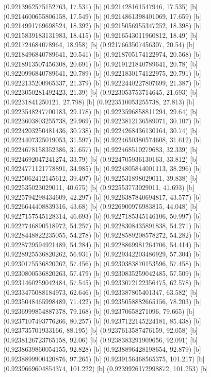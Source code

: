 {{{(0.9213962575152763, 17.531) [b] 
(0.921428161547946, 17.535) [b] 
(0.9214600655806158, 17.549) [b] 
(0.9214861398401069, 17.659) [b] 
(0.9214991769698524, 18.392) [b] 
(0.9215056955347252, 18.398) [b] 
(0.9215839183131983, 18.415) [b] 
(0.9216543011960812, 18.49) [b] 
(0.921724684078964, 18.958) [b] 
(0.9217663507456307, 20.54) [b] 
(0.9218496840789641, 20.541) [b] 
(0.9218705174122974, 20.568) [b] 
(0.9218913507456308, 20.691) [b] 
(0.9219121840789641, 20.78) [b] 
(0.9220996840789641, 20.789) [b] 
(0.9221830174122975, 20.791) [b] 
(0.9222135200965337, 21.379) [b] 
(0.9222440227807699, 21.387) [b] 
(0.9223050281492423, 21.39) [b] 
(0.9223053753714645, 21.693) [b] 
(0.92231841250121, 27.798) [b] 
(0.9223510053255738, 27.813) [b] 
(0.9223548247700183, 29.178) [b] 
(0.9223596858811294, 29.64) [b] 
(0.9223603803255738, 29.969) [b] 
(0.9223812136589071, 30.107) [b] 
(0.9224203250481436, 30.738) [b] 
(0.9224268436130164, 30.74) [b] 
(0.9224407325019053, 31.597) [b] 
(0.9224650380574608, 31.612) [b] 
(0.9224678158352386, 31.657) [b] 
(0.922468510279683, 32.339) [b] 
(0.9224692047241274, 33.79) [b] 
(0.9224705936130163, 33.812) [b] 
(0.9224771121778891, 34.985) [b] 
(0.9224805844001113, 38.296) [b] 
(0.9225062412145612, 39.497) [b] 
(0.922531898029011, 39.838) [b] 
(0.922535023029011, 40.675) [b] 
(0.922553773029011, 41.693) [b] 
(0.9225794298434609, 42.297) [b] 
(0.9226387840694817, 43.577) [b] 
(0.9226644408839316, 43.68) [b] 
(0.9226900976983815, 44.048) [b] 
(0.9227157545128314, 46.693) [b] 
(0.9227185345146106, 50.997) [b] 
(0.9227746890518972, 54.257) [b] 
(0.9228308435891838, 54.271) [b] 
(0.9228448822235055, 54.278) [b] 
(0.9228589208578272, 54.282) [b] 
(0.9228729594921489, 54.284) [b] 
(0.9228869981264706, 54.414) [b] 
(0.9228925536820262, 56.931) [b] 
(0.9229342203486929, 57.304) [b] 
(0.9230175536820262, 57.456) [b] 
(0.9230383870153596, 57.458) [b] 
(0.9230800536820263, 57.479) [b] 
(0.9230835259042485, 57.509) [b] 
(0.9231460259042484, 57.545) [b] 
(0.9233072122356475, 62.578) [b] 
(0.9233475088184973, 62.646) [b] 
(0.923387805401347, 63.582) [b] 
(0.9235048465998489, 71.422) [b] 
(0.9235058882665156, 78.203) [b] 
(0.9236999854887378, 79.168) [b] 
(0.92370658271096, 79.665) [b] 
(0.9237107493776266, 80.257) [b] 
(0.9237122145224181, 85.438) [b] 
(0.923735701933166, 88.195) [b] 
(0.9237613587476159, 92.058) [b] 
(0.9238126723765158, 92.06) [b] 
(0.9238383291909656, 92.091) [b] 
(0.9238639860054155, 92.828) [b] 
(0.9238896428198654, 92.879) [b] 
(0.9238899900420876, 97.265) [b] 
(0.9239156468565375, 101.217) [b] 
(0.9239669604854374, 101.222) [b] 
(0.9239926172998872, 101.253) [b] 
}}}
